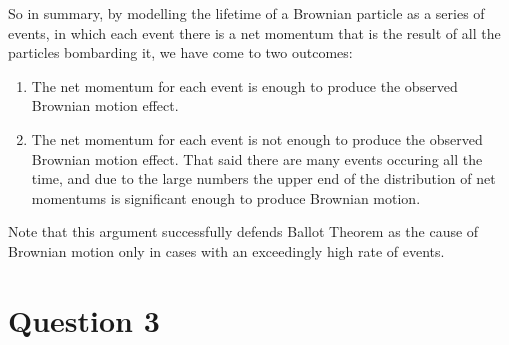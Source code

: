 \documentclass[10pt,a4paper]{article}
\begin{document}
\begin{itemize}
	So in summary, by modelling the lifetime of a Brownian particle as a series of events, in which each event there is a net momentum that is the result of all the particles bombarding it, we have come to two outcomes:
		\begin{enumerate}
			\item The net momentum for each event is enough to produce the observed Brownian motion effect.
			\item The net momentum for each event is not enough to produce the observed Brownian motion effect. That said there are many events occuring all the time, and due to the large numbers the upper end of the distribution of net momentums is significant enough to produce Brownian motion.
		\end{enumerate}

	Note that this argument successfully defends Ballot Theorem as the cause of Brownian motion only in cases with an exceedingly high rate of events.
\end{itemize}

\section*{Question 3}
\end{document}

